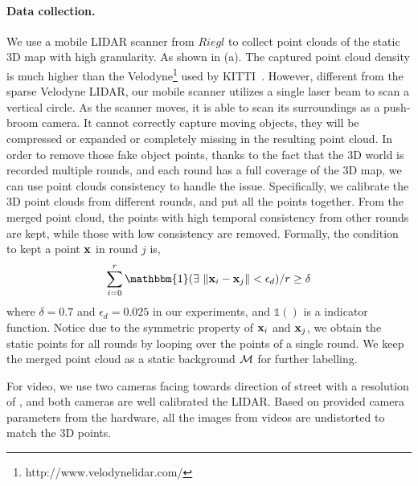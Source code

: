 \paragraph{Data collection.}
We use a mobile LIDAR scanner from $Riegl$ to collect point clouds of the static 3D map with high granularity. As shown in (a). The captured point cloud density is much higher than the Velodyne\footnote{http://www.velodynelidar.com/} used by KITTI~\cite{geiger2012we}.
However, different from the sparse Velodyne LIDAR, our mobile scanner utilizes a single laser beam to scan a vertical circle. As the scanner moves, it is able to scan its surroundings as a push-broom camera. It cannot correctly capture moving objects, they will be compressed or expanded or completely missing in the resulting point cloud.
In order to remove those fake object points, thanks to the fact that the 3D world is recorded multiple rounds, and each round has a full coverage of the 3D map, we can use point clouds consistency to handle the issue.
Specifically, we calibrate the 3D point clouds from different rounds, and put all the points together. From the merged point cloud, the points with high temporal consistency from other rounds are kept, while those with low consistency are removed. Formally, the condition to kept a point ${\mathbf x}$ in round $j$ is,
\begin{align}
\sum_{i=0}^{r}{\mathbbm{1}(\exists~\|\ve{x}_i - \ve{x}_j\| < \epsilon_d )} / r \geq \delta
\end{align}
where $\delta = 0.7$ and $\epsilon_d = 0.025$ in our experiments, and $\mathbb{1}()$ is a indicator function. Notice due to the symmetric property of ${\mathbf x}_i$ and ${\mathbf x}_j$, we obtain the static points for all rounds by looping over the points of a single round. We keep the merged point cloud as a static background ${\mathcal M}$ for further labelling.

For video, we use two cameras facing towards direction of street with a resolution of , and both cameras are well calibrated \wrt the LIDAR. Based on provided camera parameters from the hardware, all the images from videos are undistorted to match the 3D points.

